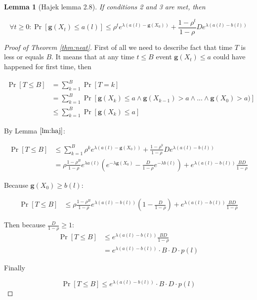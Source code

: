 \documentclass[12pt, a4paper]{article}
\newcommand{\gfun}{\mathbf{g}}
\newtheorem{lemma}[theorem]{Lemma}
\theoremstyle{remark}
\begin{document}
\begin{lemma}[Hajek lemma 2.8] \label{lm:haj}
    If conditions 2 and 3 are met, then

    $$\forall t \ge 0 :\Pr[\gfun(X_t) \leq a(l)] \leq \rho^te^{\lambda(a(l) - \gfun(X_0))} + \frac{1 - \rho^t}{1 - \rho} D e^{\lambda(a(l) - b(l))}$$
    
\end{lemma}

\begin{proof}[Proof of Theorem \ref{thm:neat}]
    
    First of all we need to describe fact that time $T$ is less or equals $B$. It means that at any time $t \leq B$  event $\gfun(X_t) \leq a$ could have happened for first time, then

    
    \begin{align*}
        \Pr[T \leq B] &= \sum_{k=1}^{B} \Pr[T = k] \\
        &= \sum_{k=1}^{B} \Pr[\gfun(X_k) \leq a \land \gfun(X_{k - 1}) > a \land ... \land \gfun(X_0) > a)] \\
        & \leq \sum_{k=1}^{B} \Pr[\gfun(X_k) \leq a]
    \end{align*}

        By Lemma $\ref{lm:haj}$:

    \begin{align*}
        \Pr[T \leq B] & \leq \sum_{k=1}^{B} \rho^k e^{\lambda(a(l) - \gfun(X_0))} + \frac{1 - \rho^k}{1 - \rho} D e^{\lambda(a(l) - b(l))}\\
        & = \rho \frac{1 - \rho^B}{1 - \rho} e^{\lambda a(l)}(e^{-\lambda\gfun(X_0)} - \frac{D}{1 - \rho} e^{-\lambda b(l)}) + e^{\lambda(a(l) - b(l))} \frac{B D}{1 - \rho}
    \end{align*}

    Because $\gfun(X_0) \ge b(l)$:

    \begin{align*}
        \Pr[T \leq B] & \leq \rho \frac{1 - \rho^B}{1 - \rho} e^{\lambda (a(l) - b(l))}(1 - \frac{D}{1 - \rho}) + e^{\lambda(a(l) - b(l))} \frac{B D}{1 - \rho}
    \end{align*}
    
    Then because $\frac{D}{1 - \rho} \ge 1 $:
    \begin{align*}
        \Pr[T \leq B] & \leq e^{\lambda(a(l) - b(l))} \frac{B D}{1 - \rho}\\
        & = e^{\lambda(a(l) - b(l))} \cdot B \cdot D \cdot p(l)
    \end{align*}

    Finally

    $$\Pr[T \leq B] \leq e^{\lambda(a(l) - b(l))} \cdot B \cdot D \cdot p(l)$$

\end{proof}
\end{document}
